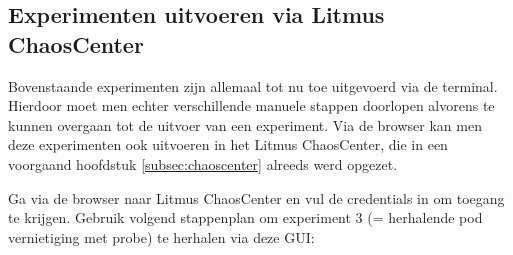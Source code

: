 \subsection{Experimenten uitvoeren via Litmus ChaosCenter}
\label{subsec:expchaoscenter}

Bovenstaande experimenten zijn allemaal tot nu toe uitgevoerd via de terminal. Hierdoor moet men echter verschillende manuele stappen doorlopen alvorens te kunnen overgaan tot de uitvoer van een experiment. Via de browser kan men deze experimenten ook uitvoeren in het Litmus ChaosCenter, die in een voorgaand hoofdstuk \ref{subsec:chaoscenter} alreeds werd opgezet. 

Ga via de browser naar Litmus ChaosCenter en vul de credentials in om toegang te krijgen. Gebruik volgend stappenplan om experiment 3 (= herhalende pod vernietiging met probe) te herhalen via deze GUI:
